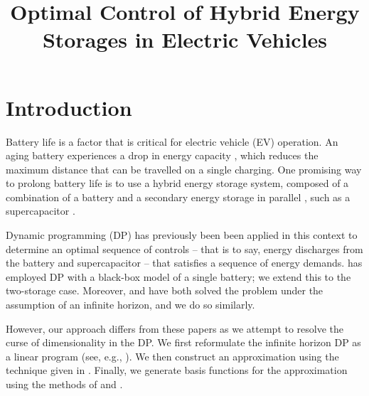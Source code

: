 \documentclass[conference]{IEEEtran}
\begin{document}
\title{Optimal Control of Hybrid Energy Storages in Electric Vehicles}

\author{
}


\maketitle


\section{Introduction}
Battery life is a factor that is critical for electric vehicle (EV) operation. An aging battery experiences a drop in energy capacity \cite{shi2017optimal}, which reduces the maximum distance that can be travelled on a single charging. One promising way to prolong battery life is to use a hybrid energy storage system, composed of a combination of a battery and a secondary energy storage in parallel \cite{thounthong2009energy}, such as a supercapacitor \cite{bambang2014energy}\cite{thounthong2009energy}\cite{7939849}. 

Dynamic programming (DP) has previously been been applied in this context to determine an optimal sequence of controls -- that is to say, energy discharges from the battery and supercapacitor -- that satisfies a sequence of energy demands. \cite{su2013modeling} has employed DP with a black-box model of a single battery; we extend this to the two-storage case. Moreover, \cite{8330176} and \cite{8315074} have both solved the problem under the assumption of an infinite horizon, and we do so similarly.

However, our approach differs from these papers as we attempt to resolve the curse of dimensionality in the DP. We first reformulate the infinite horizon DP as a linear program (see, e.g., \cite{Bertsekas:2007:DPO:1396348}). We then construct an approximation using the technique given in \cite{deFarias:2003:LPA:970869.970918}. Finally, we generate basis functions for the approximation using the methods of \cite{Bellman:1957} and \cite{Bellman1962}. %
\end{document}
